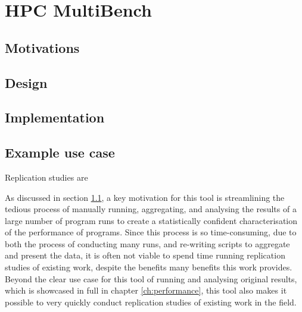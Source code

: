 \chapter{HPC MultiBench}
\label{ch:hpc-multibench} %

\section{Motivations}
\label{sec:hpc-multibench-motivation} %

\section{Design}
\label{sec:hpc-multibench-design} %




\section{Implementation}
\label{sec:hpc-multibench-implementation} %





\section{Example use case}
\label{sec:hpc-multibench-example-use-case} %


Replication studies are

As discussed in section \ref{sec:hpc-multibench-motivation}, a key motivation for this tool is streamlining the tedious process of manually running, aggregating, and analysing the results of a large number of program runs to create a statistically confident characterisation of the performance of programs. Since this process is so time-consuming, due to both the process of conducting many runs, and re-writing scripts to aggregate and present the data, it is often not viable to spend time running replication studies of existing work, despite the benefits many benefits this work provides. Beyond the clear use case for this tool of running and analysing original results, which is showcased in full in chapter \ref{ch:performance}, this tool also makes it possible to very quickly conduct replication studies of existing work in the field.

